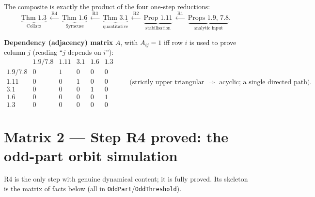 \documentclass[10pt]{article}
\newcommand{\code}[1]{\texttt{\small #1}}
\begin{document}
\noindent
The composite is exactly the product of the four one-step reductions:
\[
\underbrace{\text{Thm 1.3}}_{\text{Collatz}}
\;\xleftarrow{\ \text{R4}\ }\;
\underbrace{\text{Thm 1.6}}_{\text{Syracuse}}
\;\xleftarrow{\ \text{R3}\ }\;
\underbrace{\text{Thm 3.1}}_{\text{quantitative}}
\;\xleftarrow{\ \text{R2}\ }\;
\underbrace{\text{Prop 1.11}}_{\text{stabilisation}}
\;\xleftarrow{\ \text{R1}\ }\;
\underbrace{\text{Props 1.9, 7.8}}_{\text{analytic input}} .
\]

\noindent\textbf{Dependency (adjacency) matrix} $A$, with $A_{ij}=1$ iff row $i$
is used to prove column $j$ (reading ``$j$ depends on $i$''):
\[
\renewcommand{\arraystretch}{1.2}
\begin{array}{c|ccccc}
 & \text{1.9/7.8} & \text{1.11} & \text{3.1} & \text{1.6} & \text{1.3}\\
\hline
\text{1.9/7.8} & 0 & 1 & 0 & 0 & 0\\
\text{1.11}    & 0 & 0 & 1 & 0 & 0\\
\text{3.1}     & 0 & 0 & 0 & 1 & 0\\
\text{1.6}     & 0 & 0 & 0 & 0 & 1\\
\text{1.3}     & 0 & 0 & 0 & 0 & 0
\end{array}
\qquad
\text{(strictly upper triangular }\Rightarrow\text{ acyclic; a single directed path).}
\]

\section*{Matrix 2 \; --- \; Step R4 proved: the odd-part orbit simulation}

\noindent
R4 is the only step with genuine dynamical content; it is fully proved.  Its
skeleton is the matrix of facts below (all in \code{OddPart}/\code{OddThreshold}).
\end{document}
